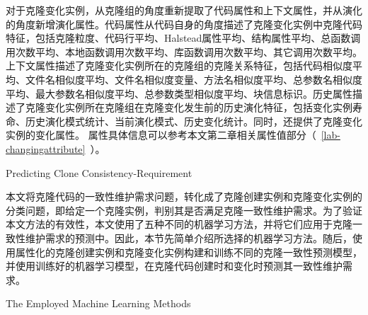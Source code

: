 对于克隆变化实例，从克隆组的角度重新提取了代码属性和上下文属性，并从演化的角度新增演化属性。代码属性从代码自身的角度描述了克隆变化实例中克隆代码特征，包括克隆粒度、代码行平均、Halstead属性平均、结构属性平均、总函数调用次数平均、本地函数调用次数平均、库函数调用次数平均、其它调用次数平均。上下文属性描述了克隆变化实例所在的克隆组的克隆关系特征，包括代码相似度平均、文件名相似度平均、文件名相似度变量、方法名相似度平均、总参数名相似度平均、最大参数名相似度平均、总参数类型相似度平均、块信息标识。历史属性描述了克隆变化实例所在克隆组在克隆变化发生前的历史演化特征，包括变化实例寿命、历史演化模式统计、当前演化模式、历史变化统计。同时，还提供了克隆变化实例的变化属性。
属性具体信息可以参考本文第二章相关属性值部分（~\ref{lab-changingattribute}~）。


{Predicting Clone Consistency-Requirement}

本文将克隆代码的一致性维护需求问题，转化成了克隆创建实例和克隆变化实例的分类问题，即给定一个克隆实例，判别其是否满足克隆一致性维护需求。为了验证本文方法的有效性，本文使用了五种不同的机器学习方法，并将它们应用于克隆一致性维护需求的预测中。因此，本节先简单介绍所选择的机器学习方法。随后，使用属性化的克隆创建实例和克隆变化实例构建和训练不同的克隆一致性预测模型，并使用训练好的机器学习模型，在克隆代码创建时和变化时预测其一致性维护需求。

{The Employed Machine Learning Methods}

